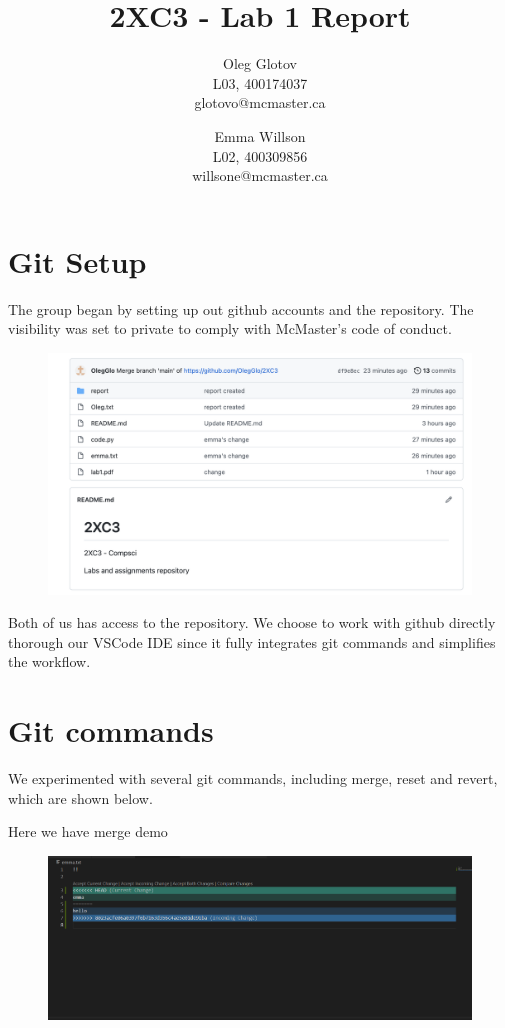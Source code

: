 \documentclass[twocolumn, 10pt]{article}
\title{2XC3 - Lab 1 Report}
\author{Oleg Glotov\\ L03, 400174037\\ glotovo@mcmaster.ca \and Emma Willson\\ L02, 400309856\\ willsone@mcmaster.ca}
\begin{document}
\maketitle
\section{Git Setup}\label{sec:git}
The group began by setting up out github accounts and the repository. The visibility was set to private to comply with McMaster's code of conduct.

\begin{figure}[H]
\includegraphics[width=\linewidth]{img1}
\end{figure}

Both of us has access to the repository. We choose to work with github directly thorough our VSCode IDE since it fully integrates git commands and simplifies the workflow.

\section{Git commands}

We experimented with several git commands, including merge, reset and revert, which are shown below. 

Here we have merge demo

\begin{figure}[H]
\includegraphics[width=\linewidth]{merge}
\end{figure}
\end{document}
